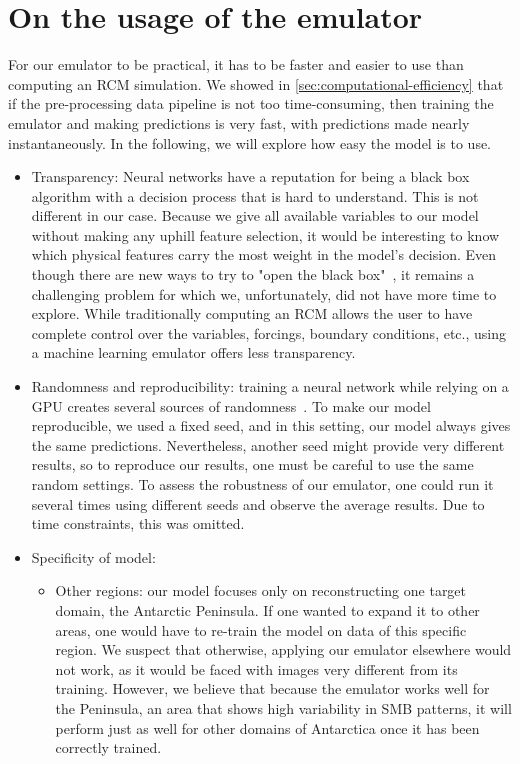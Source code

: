 \documentclass[a4paper,11pt,oneside]{report}
\begin{document}
\section{On the usage of the emulator}\label{sec:utility-emulators}
For our emulator to be practical, it has to be faster and easier to use than computing an RCM simulation. We showed in \autoref{sec:computational-efficiency} that if the pre-processing data pipeline is not too time-consuming, then training the emulator and making predictions is very fast, with predictions made nearly instantaneously. In the following, we will explore how easy the model is to use.  
\begin{itemize}
    \item Transparency: Neural networks have a reputation for being a black box algorithm with a decision process that is hard to understand. This is not different in our case. Because we give all available variables to our model without making any uphill feature selection, it would be interesting to know which physical features carry the most weight in the model's decision. Even though there are new ways to try to "open the black box"~\cite{Guidotti, Doury}, it remains a challenging problem for which we, unfortunately, did not have more time to explore. While traditionally computing an RCM allows the user to have complete control over the variables, forcings, boundary conditions, etc., using a machine learning emulator offers less transparency.  
    \item Randomness and reproducibility: training a neural network while relying on a GPU creates several sources of randomness~\cite{Doury,Zhuang2021}. To make our model reproducible, we used a fixed seed, and in this setting, our model always gives the same predictions. Nevertheless, another seed might provide very different results, so to reproduce our results, one must be careful to use the same random settings. To assess the robustness of our emulator, one could run it several times using different seeds and observe the average results. Due to time constraints, this was omitted. 
    \item Specificity of model: 
    \begin{itemize}
        \item Other regions: our model focuses only on reconstructing one target domain, the Antarctic Peninsula. If one wanted to expand it to other areas, one would have to re-train the model on data of this specific region. We suspect that otherwise, applying our emulator elsewhere would not work, as it would be faced with images very different from its training. However, we believe that because the emulator works well for the Peninsula, an area that shows high variability in SMB patterns, it will perform just as well for other domains of Antarctica once it has been correctly trained. 

\end{itemize}
\end{itemize}
\end{document}
